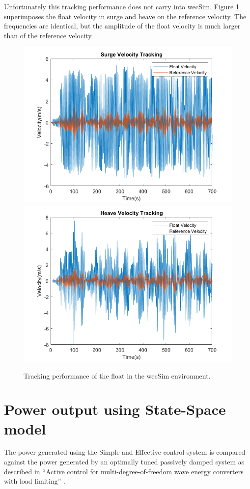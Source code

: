 \documentclass{report}
\begin{document}
Unfortunately this tracking performance does not carry into wecSim. Figure \ref{wecSimTracking} superimposes the float velocity in surge and heave on the reference velocity. The frequencies are identical, but the amplitude of the float velocity is much larger than of the reference velocity.

\begin{figure}
\centering
\includegraphics[scale=0.5]{graphs/wecSimSurgeTracking}
\includegraphics[scale=0.5]{graphs/wecSimHeaveTracking}
\caption{Tracking performance of the float in the wecSim environment.}
\label{wecSimTracking}
\end{figure} 

\FloatBarrier
\section{Power output using State-Space model}
The power generated using the Simple and Effective control system is compared against the power generated by an optimally tuned passively damped system as described in ``Active control for multi-degree-of-freedom wave energy converters with load limiting'' \cite{andyMPC}.
\end{document}
